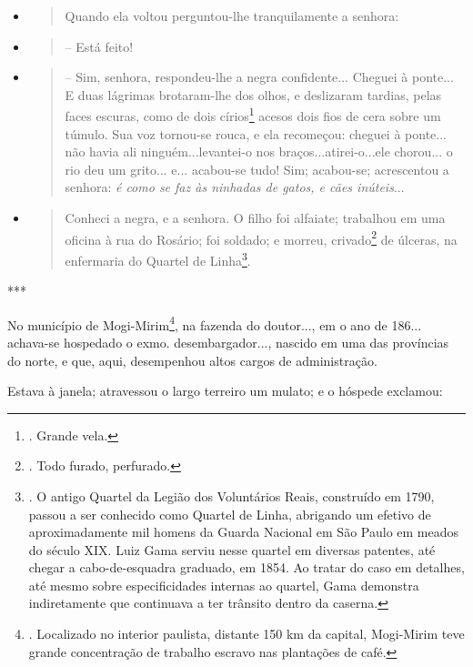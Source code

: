 \begin{itemize}
\item
  \begin{quote}
  Quando ela voltou perguntou-lhe tranquilamente a senhora:
  \end{quote}
\item
  \begin{quote}
  -- Está feito!
  \end{quote}
\item
  \begin{quote}
  -- Sim, senhora, respondeu-lhe a negra confidente... Cheguei à
  ponte... E duas lágrimas brotaram-lhe dos olhos, e deslizaram tardias,
  pelas faces escuras, como de dois círios\footnote{. Grande vela.}
  acesos dois fios de cera sobre um túmulo. Sua voz tornou-se rouca, e
  ela recomeçou: cheguei à ponte... não havia ali ninguém...levantei-o
  nos braços...atirei-o...ele chorou... o rio deu um grito... e...
  acabou-se tudo! Sim; acabou-se; acrescentou a senhora: \emph{é como se
  faz às ninhadas de gatos, e cães inúteis}...
  \end{quote}
\item
  \begin{quote}
  Conheci a negra, e a senhora. O filho foi alfaiate; trabalhou em uma
  oficina à rua do Rosário; foi soldado; e morreu, crivado\footnote{.
    Todo furado, perfurado.} de úlceras, na enfermaria do Quartel de
  Linha\footnote{. O antigo Quartel da Legião dos Voluntários Reais,
    construído em 1790, passou a ser conhecido como Quartel de Linha,
    abrigando um efetivo de aproximadamente mil homens da Guarda
    Nacional em São Paulo em meados do século XIX. Luiz Gama serviu
    nesse quartel em diversas patentes, até chegar a cabo-de-esquadra
    graduado, em 1854. Ao tratar do caso em detalhes, até mesmo sobre
    especificidades internas ao quartel, Gama demonstra indiretamente
    que continuava a ter trânsito dentro da caserna.}.
  \end{quote}
\end{itemize}

***

No município de Mogi-Mirim\footnote{. Localizado no interior paulista,
  distante 150 km da capital, Mogi-Mirim teve grande concentração de
  trabalho escravo nas plantações de café.}, na fazenda do doutor..., em
o ano de 186... achava-se hospedado o exmo. desembargador..., nascido em
uma das províncias do norte, e que, aqui, desempenhou altos cargos de
administração.

Estava à janela; atravessou o largo terreiro um mulato; e o hóspede
exclamou:

